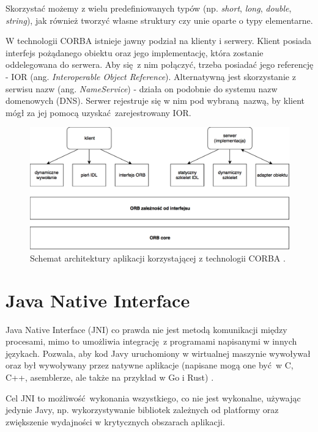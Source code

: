 Skorzystać możemy z wielu predefiniowanych typów (np. \textit{short}, \textit{long}, \textit{double}, \textit{string}), jak również tworzyć własne struktury czy unie oparte o typy elementarne.

W technologii CORBA istnieje jawny podział na klienty i serwery. Klient posiada interfejs pożądanego obiektu oraz jego implementację, która zostanie oddelegowana do serwera. Aby się z nim połączyć, trzeba posiadać jego referencję - IOR (ang. \textit{Interoperable Object Reference}). Alternatywną jest skorzystanie z serwisu nazw (ang. \textit{NameService}) - działa on podobnie do systemu nazw domenowych (DNS). Serwer rejestruje się w nim pod wybraną nazwą, by klient mógł za jej pomocą uzyskać zarejestrowany IOR.

\begin{figure}[h]
    \centering
    \includegraphics[width=\textwidth,height=\textheight,keepaspectratio]{img/CORBA_architecture.png}
    \caption{Schemat architektury aplikacji korzystającej z technologii CORBA \cite{Saw02}.}
    \label{fig:CORBA_architecture}
\end{figure}


\section{Java Native Interface}

Java Native Interface (JNI) co prawda nie jest metodą komunikacji między procesami, mimo to umożliwia integrację z programami napisanymi w innych językach. Pozwala, aby kod Javy uruchomiony w wirtualnej maszynie wywoływał oraz był wywoływany przez natywne aplikacje (napisane mogą one być w C, C++, asemblerze, ale także na przykład w Go i Rust) \cite{JNI17}.

Cel JNI to możliwość wykonania wszystkiego, co nie jest wykonalne, używając jedynie Javy, np. wykorzystywanie bibliotek zależnych od platformy oraz zwiększenie wydajności w krytycznych obszarach aplikacji.

